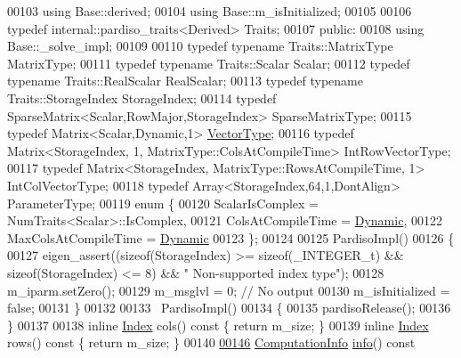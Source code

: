 \begin{DoxyCode}
00103     \textcolor{keyword}{using} Base::derived;
00104     \textcolor{keyword}{using} Base::m\_isInitialized;
00105     
00106     \textcolor{keyword}{typedef} internal::pardiso\_traits<Derived> Traits;
00107   \textcolor{keyword}{public}:
00108     \textcolor{keyword}{using} Base::\_solve\_impl;
00109     
00110     \textcolor{keyword}{typedef} \textcolor{keyword}{typename} Traits::MatrixType MatrixType;
00111     \textcolor{keyword}{typedef} \textcolor{keyword}{typename} Traits::Scalar Scalar;
00112     \textcolor{keyword}{typedef} \textcolor{keyword}{typename} Traits::RealScalar RealScalar;
00113     \textcolor{keyword}{typedef} \textcolor{keyword}{typename} Traits::StorageIndex StorageIndex;
00114     \textcolor{keyword}{typedef} SparseMatrix<Scalar,RowMajor,StorageIndex> SparseMatrixType;
00115     \textcolor{keyword}{typedef} Matrix<Scalar,Dynamic,1> \hyperlink{struct_vector_type}{VectorType};
00116     \textcolor{keyword}{typedef} Matrix<StorageIndex, 1, MatrixType::ColsAtCompileTime> IntRowVectorType;
00117     \textcolor{keyword}{typedef} Matrix<StorageIndex, MatrixType::RowsAtCompileTime, 1> IntColVectorType;
00118     \textcolor{keyword}{typedef} Array<StorageIndex,64,1,DontAlign> ParameterType;
00119     \textcolor{keyword}{enum} \{
00120       ScalarIsComplex = NumTraits<Scalar>::IsComplex,
00121       ColsAtCompileTime = \hyperlink{namespace_eigen_ad81fa7195215a0ce30017dfac309f0b2}{Dynamic},
00122       MaxColsAtCompileTime = \hyperlink{namespace_eigen_ad81fa7195215a0ce30017dfac309f0b2}{Dynamic}
00123     \};
00124 
00125     PardisoImpl()
00126     \{
00127       eigen\_assert((\textcolor{keyword}{sizeof}(StorageIndex) >= \textcolor{keyword}{sizeof}(\_INTEGER\_t) && \textcolor{keyword}{sizeof}(StorageIndex) <= 8) && \textcolor{stringliteral}{"
      Non-supported index type"});
00128       m\_iparm.setZero();
00129       m\_msglvl = 0; \textcolor{comment}{// No output}
00130       m\_isInitialized = \textcolor{keyword}{false};
00131     \}
00132 
00133     ~PardisoImpl()
00134     \{
00135       pardisoRelease();
00136     \}
00137 
00138     \textcolor{keyword}{inline} \hyperlink{namespace_eigen_a62e77e0933482dafde8fe197d9a2cfde}{Index} cols()\textcolor{keyword}{ const }\{ \textcolor{keywordflow}{return} m\_size; \}
00139     \textcolor{keyword}{inline} \hyperlink{namespace_eigen_a62e77e0933482dafde8fe197d9a2cfde}{Index} rows()\textcolor{keyword}{ const }\{ \textcolor{keywordflow}{return} m\_size; \}
00140   
\hyperlink{class_eigen_1_1_pardiso_impl_a7dce1175518593e33d32e30ab0ffee3b}{00146}     \hyperlink{group__enums_ga85fad7b87587764e5cf6b513a9e0ee5e}{ComputationInfo} \hyperlink{class_eigen_1_1_pardiso_impl_a7dce1175518593e33d32e30ab0ffee3b}{info}()\textcolor{keyword}{ const}

\end{DoxyCode}
